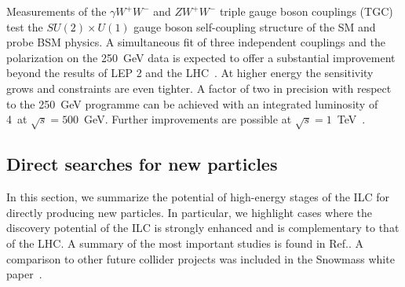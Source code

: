 Measurements of the $\gamma W^+W^-$ and $ZW^+W^-$ triple gauge boson couplings (TGC) test the $SU(2) \times U(1)$
gauge boson self-coupling structure of the SM and probe BSM physics. A simultaneous fit of three independent couplings and
the polarization on the 250~GeV{} data is expected to offer a substantial improvement beyond the results of LEP 2 and the
LHC~\cite{Fujii:2017vwa}. At higher energy the sensitivity grows and constraints are even tighter. A factor of two in
precision\cite{Marchesini:2011aka} with respect to the 250~GeV{} programme can be achieved with an integrated
luminosity of 4~\iab at $\sqrt{s}=500$~GeV. Further improvements are possible at   $\sqrt{s}=1$~TeV~\cite{Rosca:2016hcq}.



\subsection{Direct searches for new particles}
\label{subsec:highE:searches}

In this section, we summarize the potential of high-energy stages of the ILC for directly producing
new particles. In particular, we highlight cases where the discovery potential of the ILC is strongly enhanced and
is complementary to that of the LHC. A summary of the most important studies is found in Ref.\cite{Fujii:2017ekh}.
A comparison to other future collider projects was included in the Snowmass white paper~\cite{Baer:2013vqa}. 




